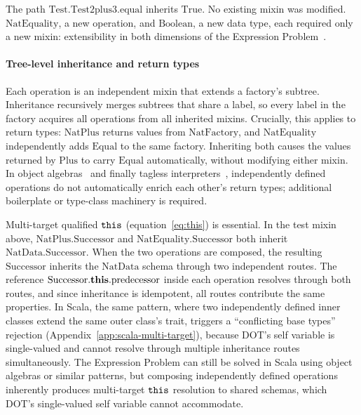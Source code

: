 The path $\mathrm{Test}.\mathrm{Test2plus3}.\mathrm{equal}$
inherits $\mathrm{True}$.
No existing mixin was modified.
$\mathrm{NatEquality}$, a new operation, and $\mathrm{Boolean}$,
a new data type, each required only a new mixin: extensibility in both
dimensions of the Expression Problem~\cite{wadler1998-expression-problem}.

\paragraph{Tree-level inheritance and return types}
\label{sec:discussion-expression-problem}
Each operation is an independent mixin that extends a factory's
subtree.
Inheritance recursively merges subtrees that share a label,
so every label in the factory acquires all operations from all
inherited mixins.
Crucially, this applies to return types: $\mathrm{NatPlus}$ returns
values from $\mathrm{NatFactory}$, and $\mathrm{NatEquality}$
independently adds $\mathrm{Equal}$ to the same factory.
Inheriting both causes the values returned by $\mathrm{Plus}$ to
carry $\mathrm{Equal}$ automatically, without modifying either mixin.
In object algebras~\cite{oliveira2012-object-algebras} and finally
tagless interpreters~\cite{carette2009-finally-tagless}, independently defined
operations do not automatically enrich each other's return types;
additional boilerplate or type-class machinery is required.

Multi-target qualified $\mathtt{this}$ (equation~\ref{eq:this}) is essential.
In the test mixin above, $\mathrm{NatPlus}.\mathrm{Successor}$ and
$\mathrm{NatEquality}.\mathrm{Successor}$ both inherit
$\mathrm{NatData}.\mathrm{Successor}$.
When the two operations are composed, the resulting
$\mathrm{Successor}$ inherits the $\mathrm{NatData}$ schema
through two independent routes.
The reference
$\mathrm{Successor}.\mathbf{this}.\mathrm{predecessor}$
inside each operation resolves through both routes, and since
inheritance is idempotent, all routes contribute the same
properties.
In Scala, the same pattern, where two independently defined inner
classes extend the same outer class's trait, triggers a
``conflicting base types'' rejection
(Appendix~\ref{app:scala-multi-target}), because DOT's self variable
is single-valued and cannot resolve through multiple inheritance
routes simultaneously.
The Expression Problem can still be solved in Scala using
object algebras or similar patterns, but composing independently
defined operations inherently produces multi-target $\mathtt{this}$ resolution to
shared schemas, which DOT's single-valued self variable cannot
accommodate.

